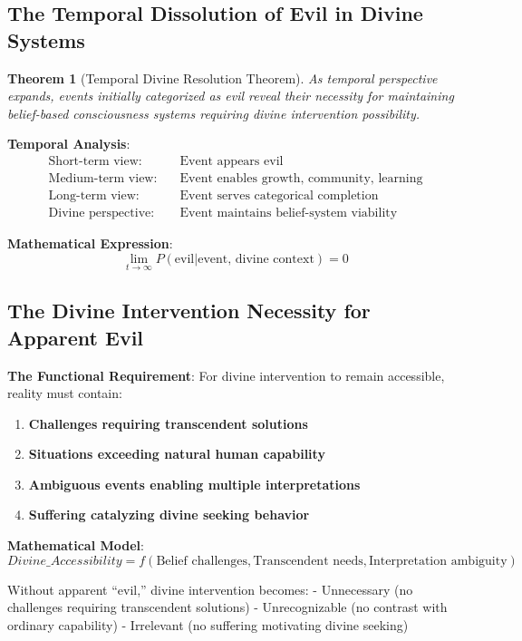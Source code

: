 \documentclass[12pt,a4paper]{article}
\newtheorem{theorem}{Theorem}[section]
\begin{document}
\subsection{The Temporal Dissolution of Evil in Divine Systems}

\begin{theorem}[Temporal Divine Resolution Theorem]
As temporal perspective expands, events initially categorized as evil reveal their necessity for maintaining belief-based consciousness systems requiring divine intervention possibility.
\end{theorem}

\textbf{Temporal Analysis}:
\begin{align}
\text{Short-term view:} \quad &\text{Event appears evil}\\
\text{Medium-term view:} \quad &\text{Event enables growth, community, learning}\\
\text{Long-term view:} \quad &\text{Event serves categorical completion}\\
\text{Divine perspective:} \quad &\text{Event maintains belief-system viability}
\end{align}

\textbf{Mathematical Expression}:
$$\lim_{t \to \infty} P(\text{evil}|\text{event, divine context}) = 0$$

\subsection{The Divine Intervention Necessity for Apparent Evil}

\textbf{The Functional Requirement}:
For divine intervention to remain accessible, reality must contain:

\begin{enumerate}
\item \textbf{Challenges requiring transcendent solutions}
\item \textbf{Situations exceeding natural human capability}  
\item \textbf{Ambiguous events enabling multiple interpretations}
\item \textbf{Suffering catalyzing divine seeking behavior}
\end{enumerate}

\textbf{Mathematical Model}:
$$Divine\_Accessibility = f(\text{Belief challenges}, \text{Transcendent needs}, \text{Interpretation ambiguity})$$

Without apparent ``evil,'' divine intervention becomes:
- Unnecessary (no challenges requiring transcendent solutions)
- Unrecognizable (no contrast with ordinary capability)
- Irrelevant (no suffering motivating divine seeking)
\end{document}
